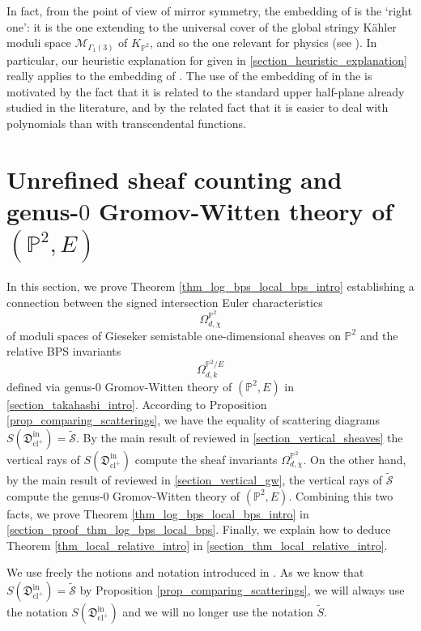 \documentclass[11pt,letterpaper]{amsart}
\newcommand\PP{\mathbb P}
\newcommand\cM{\mathcal M}
\newcommand\fD{\mathfrak D}
\newcommand\cl{\operatorname{cl}}
\newcommand\iin{\mathrm{in}}
\begin{document}
In fact, from the point of view of mirror symmetry, the embedding of
\cite[Theorem 9.3]{MR2852118} is the `right one': it is the one extending to the universal cover of the global stringy K\"ahler moduli space $\cM_{\Gamma_1(3)}$ of $K_{\PP^2}$, and so the one relevant for physics (see \cite[\S 0.4.3]{bousseau2019scattering}).
In particular, our heuristic explanation for 
\cite[Theorem 5.9]{bousseau2019scattering} given in \cref{section_heuristic_explanation} really applies to the embedding of  \cite[Theorem 9.3]{MR2852118}. The use of the embedding of 
\cite[Proposition 2.14]{bousseau2019scattering} in the \cite{bousseau2019scattering} is motivated by the fact that it is related to the standard upper half-plane already 
studied in the literature, and by the related fact that it is easier to deal with polynomials than with transcendental functions.


\section{Unrefined sheaf counting and genus-$0$ Gromov-Witten theory of $(\PP^2,E)$}
\label{section_takahashi_proof}




In this section, we prove Theorem \ref{thm_log_bps_local_bps_intro} establishing 
a connection between the signed intersection Euler characteristics \[ \Omega_{d,\chi}^{\PP^2} \]
of moduli spaces of Gieseker semistable one-dimensional sheaves on $\PP^2$ and the relative BPS invariants 
\[ \Omega_{d,k}^{\PP^2/E}\] 
defined via genus-$0$ Gromov-Witten theory of $(\PP^2,E)$
in \cref{section_takahashi_intro}. According to Proposition 
\ref{prop_comparing_scatterings}, we have the equality of scattering diagrams 
$S(\fD^{\iin}_{\cl^+})=\tilde{\mathcal{S}}$. By the main result of \cite{bousseau2019scattering}
reviewed in \cref{section_vertical_sheaves} the vertical rays of 
$S(\fD^{\iin}_{\cl^+})$ compute the sheaf invariants $\Omega_{d,\chi}^{\PP^2}$.
On the other hand, by the main result of \cite{gabele2019tropical} 
reviewed in \cref{section_vertical_gw},
the vertical rays of $\tilde{\mathcal{S}}$ compute the genus-$0$
Gromov-Witten theory of $(\PP^2,E)$. Combining this two facts, we prove 
Theorem \ref{thm_log_bps_local_bps_intro} in \cref{section_proof_thm_log_bps_local_bps}. Finally, we explain how to deduce
Theorem \ref{thm_local_relative_intro}
in \cref{section_thm_local_relative_intro}.


We use freely the notions and notation introduced in 
\cite{bousseau2019scattering}. As we know that $S(\fD^{\iin}_{\cl^+})=\tilde{\mathcal{S}}$
by Proposition 
\ref{prop_comparing_scatterings}, we will always use the notation 
$S(\fD^{\iin}_{\cl^+})$ and we will no longer use the notation 
$\tilde{S}$.
\end{document}
